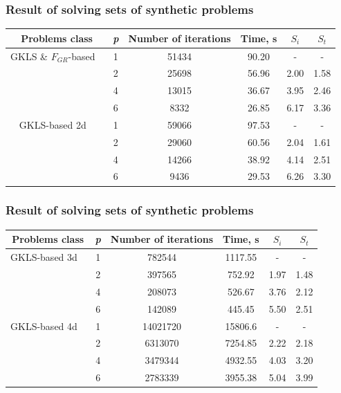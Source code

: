 \documentclass[aspectratio=1610]{beamer}
\begin{document}
\begin{frame}
  \frametitle{Result of solving sets of synthetic problems}
  \begin{table}
    \centering
    \begin{tabular}{c|c|c|c|c|c}
      Problems class & \textit{p} & Number of iterations & Time, s & \(S_i\) & \(S_t\)   \\
      \hline
      GKLS \& \(F_{GR}\)-based \
        & 1 & 51434 & 90.20 & -    & - \\
        & 2 & 25698 & 56.96 & 2.00 & 1.58 \\
        & 4 & 13015 & 36.67 & 3.95 & 2.46 \\
        & 6 & 8332  & 26.85 & 6.17 & 3.36 \\
      \hline
      GKLS-based 2d \
        & 1 & 59066 & 97.53 & -    & - \\
        & 2 & 29060 & 60.56 & 2.04 & 1.61 \\
        & 4 & 14266 & 38.92 & 4.14 & 2.51 \\
        & 6 & 9436  & 29.53 & 6.26 & 3.30 \\
      \hline
    \end{tabular}
  \end{table}
\end{frame}
\begin{frame}
  \frametitle{Result of solving sets of synthetic problems}
  \begin{table}
    \centering
    \begin{tabular}{c|c|c|c|c|c}
      Problems class & \textit{p} & Number of iterations & Time, s & \(S_i\) & \(S_t\)   \\
      \hline
      GKLS-based 3d \
        & 1 & 782544 & 1117.55 & -    & - \\
        & 2 & 397565 & 752.92  & 1.97 & 1.48 \\
        & 4 & 208073 & 526.67  & 3.76 & 2.12 \\
        & 6 & 142089 & 445.45  & 5.50 & 2.51 \\
      \hline
      GKLS-based 4d \
        & 1 & 14021720 & 15806.6 & -    & - \\
        & 2 & 6313070 & 7254.85  & 2.22 & 2.18 \\
        & 4 & 3479344 & 4932.55  & 4.03 & 3.20 \\
        & 6 & 2783339 & 3955.38  & 5.04 & 3.99 \\
      \hline
    \end{tabular}
  \end{table}
\end{frame}
\end{document}

